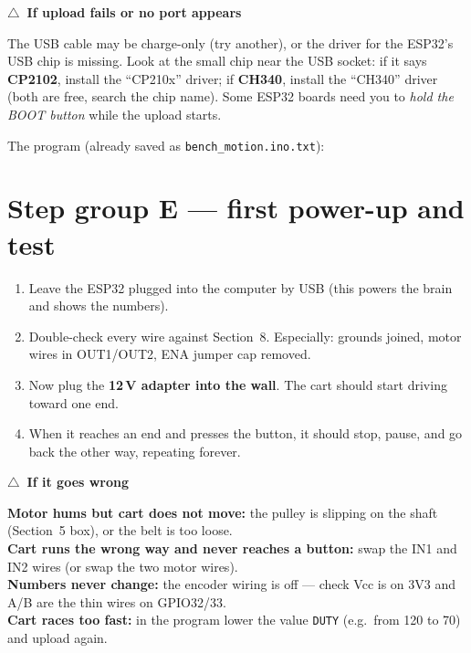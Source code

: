 \documentclass[11pt,a4paper]{article}
\newcommand{\warn}{\textcolor{orange!80!black}{$\triangle$}}
\newenvironment{checkbox}[1]
  {\par\medskip\noindent\begin{lrbox}{\gbbox}\begin{minipage}{0.95\linewidth}\footnotesize\textbf{#1}\par\smallskip}
  {\end{minipage}\end{lrbox}\setlength{\fboxsep}{8pt}\fcolorbox{red!60!black}{red!5}{\usebox{\gbbox}}\par\medskip}
\begin{document}
\begin{checkbox}{\warn\ If upload fails or no port appears}
The USB cable may be charge-only (try another), or the driver for the ESP32's USB chip is missing. Look
at the small chip near the USB socket: if it says \textbf{CP2102}, install the ``CP210x'' driver; if
\textbf{CH340}, install the ``CH340'' driver (both are free, search the chip name). Some ESP32 boards
need you to \emph{hold the BOOT button} while the upload starts.
\end{checkbox}

\noindent The program (already saved as \texttt{bench\_motion.ino.txt}):


\section{Step group E --- first power-up and test}

\begin{enumerate}[leftmargin=*,itemsep=3pt]
  \item Leave the ESP32 plugged into the computer by USB (this powers the brain and shows the numbers).
  \item Double-check every wire against Section~8. Especially: grounds joined, motor wires in OUT1/OUT2,
  ENA jumper cap removed.
  \item Now plug the \textbf{12\,V adapter into the wall}. The cart should start driving toward one end.
  \item When it reaches an end and presses the button, it should stop, pause, and go back the other way,
  repeating forever.
\end{enumerate}

\begin{checkbox}{\warn\ If it goes wrong}
\textbf{Motor hums but cart does not move:} the pulley is slipping on the shaft (Section~5 box), or the
belt is too loose. \\
\textbf{Cart runs the wrong way and never reaches a button:} swap the IN1 and IN2 wires (or swap the two
motor wires). \\
\textbf{Numbers never change:} the encoder wiring is off --- check Vcc is on 3V3 and A/B are the thin
wires on GPIO32/33. \\
\textbf{Cart races too fast:} in the program lower the value \texttt{DUTY} (e.g.\ from 120 to 70) and
upload again.
\end{checkbox}
\end{document}
